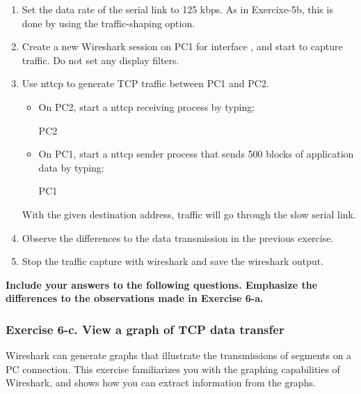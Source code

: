 \begin{enumerate}
	\item Set the data rate of the serial link to 125 kbps. As in Exercixe-5b, this is done by using the traffic-shaping option.
	\item Create a new Wireshark session on PC1 for interface , and start to capture traffic. Do not set any display filters.
	\item Use nttcp to generate TCP traffic between PC1 and PC2.
		\begin{itemize}
			\item On PC2, start a nttcp receiving process by typing:
				\begin{cmdblock}
	PC2%
				\end{cmdblock}
			\item On PC1, start a nttcp sender process that sends 500 blocks of application data by typing:
				\begin{cmdblock}
	PC1%
				\end{cmdblock}
		\end{itemize}
		With the given destination address, traffic will go through the slow serial link.
	\item Observe the differences to the data transmission in the previous exercise.
	\item Stop the traffic capture with wireshark and save the wireshark output.
\end{enumerate}

\textbf{Include your answers to the following questions. Emphasize the differences to the observations made in Exercise 6-a.}
\begin{questions}
\end{questions}

\subsubsection{Exercise 6-c. View a graph of TCP data transfer}
Wireshark can generate graphs that illustrate the transmissions of segments on a PC connection. This exercise familiarizes you with the graphing capabilities of Wireshark, and shows how you can extract information from the graphs.

